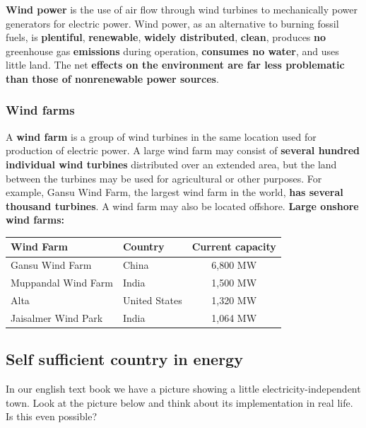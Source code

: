 \documentclass[11pt, titlepage]{article}
\begin{document}
		\textbf{Wind power} is the use of air flow through wind turbines to mechanically power generators for electric power. Wind power, as an alternative to burning fossil fuels, is \textbf{plentiful}, \textbf{renewable}, \textbf{widely distributed}, \textbf{clean}, produces \textbf{no} greenhouse gas \textbf{emissions} during operation, \textbf{consumes no water}, and uses little land. The net \textbf{effects on the environment are far less problematic than those of nonrenewable power sources}.



		\subsubsection{Wind farms}
			A \textbf{wind farm} is a group of wind turbines in the same location used for production of electric power. A large wind farm may consist of \textbf{several hundred individual wind turbines} distributed over an extended area, but the land between the turbines may be used for agricultural or other purposes. For example, Gansu Wind Farm, the largest wind farm in the world, \textbf{has several thousand turbines}. A wind farm may also be located offshore.
			\newpage
			\textbf{Large onshore wind farms:}
			\newline

			\begin{tabular}{|l|l|c|}
			  	\hline
				\bf{Wind Farm}&\bf{Country}&\bf{Current capacity}\\
				\hline
				Gansu Wind Farm & China & 6,800 MW\\
				Muppandal Wind Farm & India &1,500 MW\\
				Alta & United States   &1,320 MW \\
				Jaisalmer Wind Park & India & 1,064 MW\\
				\hline
			\end{tabular}

			\subsection{Self sufficient country in energy}
			In our english text book we have a picture showing a little electricity-independent town.
			\newline
			Look at the picture below and think about its implementation in real life. Is this even possible?
\end{document}
